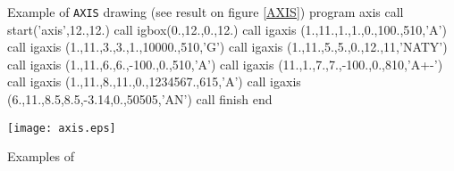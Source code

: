 \newpage

\begin{XMPt}{Example of {\tt AXIS} drawing (see result on figure \ref{AXIS})}
      program axis 
      call start('axis',12.,12.)
      call igbox(0.,12.,0.,12.)
      call igaxis (1.,11.,1.,1.,0.,100.,510,'A')
      call igaxis (1.,11.,3.,3.,1.,10000.,510,'G')
      call igaxis (1.,11.,5.,5.,0.,12.,11,'NATY')
      call igaxis (1.,11.,6.,6.,-100.,0.,510,'A')
      call igaxis (11.,1.,7.,7.,-100.,0.,810,'A+-')
      call igaxis (1.,11.,8.,11.,0.,1234567.,615,'A')
      call igaxis (6.,11.,8.5,8.5,-3.14,0.,50505,'AN')
      call finish
      end
\end{XMPt}
 
\begin{Fighere}
\begin{center}
\texttt{[image: axis.eps]}
\end{center}
\caption{Examples of \protect{}}
\label{AXIS}
\end{Fighere}
 
\newpage

